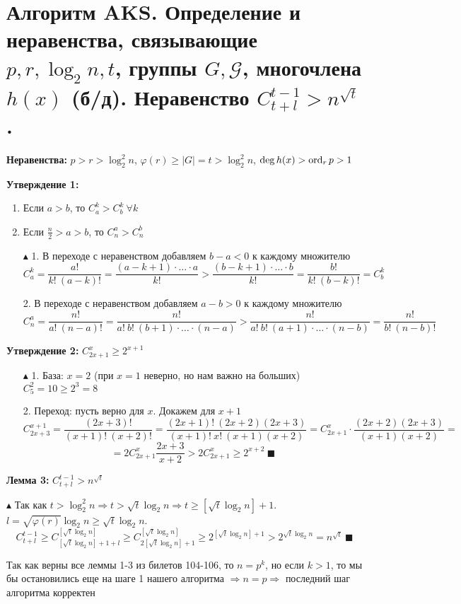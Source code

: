 \setcounter{section}{105}
\section{Алгоритм AKS. Определение и неравенства, связывающие $p, r, \log_2 n, t$, группы $G, \mathcal{G}$, многочлена $h(x)$ (б/д). Неравенство $C_{t+l}^{t-1}>n^{\sqrt{t}}$.}
\par \textbf{Неравенства:} $p>r>\log_2^2n$, $\varphi(r)\geq|G|=t>\log_2^2 n$, $\deg h(x) > \operatorname{ord}_r p > 1$
\par \textbf{Утверждение 1:} \begin{enumerate}
    \item Если $a>b$, то $C^k_a>C^k_b \: \forall k$
    \item Если $\frac{n}{2}>a>b$, то $C^a_n>C^b_n$
\end{enumerate}
\par  \begin{itemize}
    \item[$\blacktriangle$ 1.]  В переходе с неравенством добавляем $b-a<0$ к каждому множителю$$C^k_a=\frac{a!}{k! \: (a-k)!}=\frac{(a-k+1)\cdot \ldots \cdot a}{k!}>\frac{(b-k+1) \cdot \ldots \cdot b}{k!}=\frac{b!}{k! \: (b-k)!}=C^k_b$$
    \item[2.] В переходе с неравенством добавляем $a-b>0$ к каждому множителю $$C^a_n=\frac{n!}{a! \: (n-a)!}=\frac{n!}{a! \: b! \: (b+1) \cdot \ldots \cdot (n-a)}>\frac{n!}{a! \: b! \: (a+1) \cdot \ldots \cdot (n-b)}=\frac{n!}{b! \: (n-b)!}$$
\end{itemize}
\par \textbf{Утверждение 2:} $C_{2x+1}^x \geq 2^{x+1}$
\par \begin{itemize}
    \item[$\blacktriangle$ 1.] База: $x=2$ (при $x=1$ неверно, но нам важно на больших) $C_5^2=10 \geq 2^3=8$
    \item[2.] Переход: пусть верно для $x$. Докажем для $x+1$ $$C^{x+1}_{2x+3}=\frac{(2x+3)!}{(x+1)! \: (x+2)!}=\frac{(2x+1)! \: (2x+2)(2x+3)}{(x+1)! \: x! \: (x+1)(x+2)}=C_{2x+1}^x \cdot \frac{(2x+2)(2x+3)}{(x+1)(x+2)}=$$ $$=2C^x_{2x+1} \frac{2x+3}{x+2} > 2C^x_{2x+1} \geq 2^{x+2} \: \blacksquare$$
\end{itemize}
\par \textbf{Лемма 3:} $C_{t+l}^{t-1}>n^{\sqrt{t}}$
\par $\blacktriangle$ Так как $t>\log_2^2 n \Rightarrow t > \sqrt{t} \log_2 n \Rightarrow t \geq [\sqrt{t} \log_2 n]+1$. $l=\sqrt{\varphi(r)}\log_2 n \geq \sqrt{t} \log_2 n$. 
$$C_{t+l}^{t-1}\geq C_{[\sqrt{t}\log_2 n]+1+l}^{[\sqrt{t}\log_2 n]}\geq C_{2[\sqrt{t}\log_2 n]+1}^{[\sqrt{t}\log_2 n]} \geq 2^{[\sqrt{t}\log_2 n]+1} > 2^{\sqrt{t}\log_2 n}=n^{\sqrt{t}} \: \blacksquare$$
\par Так как верны все леммы 1-3 из билетов 104-106, то $n=p^k$, но если $k > 1$, то мы бы остановились еще на шаге 1 нашего алгоритма $\Rightarrow n=p \Rightarrow$ последний шаг алгоритма корректен 